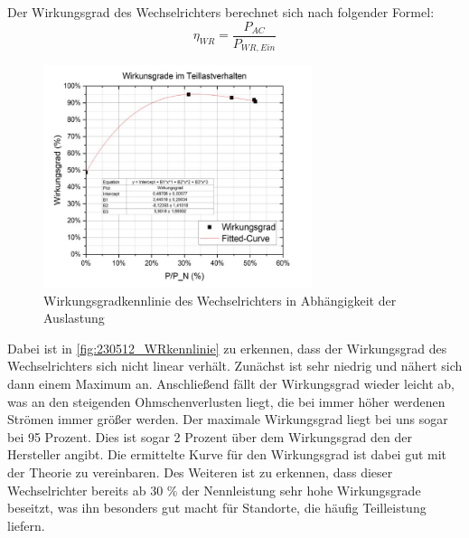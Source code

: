 Der Wirkungsgrad des Wechselrichters berechnet sich nach folgender Formel:
%
\begin{equation}
	\eta_{ WR} = \frac{ P_{AC} }{ P_{WR,Ein} }
	\label{eq:230509_Wirkungsgrad}
\end{equation}
%
%
\begin{figure}[!ht]
		\centering
		\includegraphics[width=0.7\textwidth]{Abbildungen/Kennlinie wr}
		\caption{Wirkungsgradkennlinie des Wechselrichters in Abhängigkeit der Auslastung}
		\label{fig:230512_WRkennlinie}
\end{figure}
%
Dabei ist in \autoref{fig:230512_WRkennlinie} zu erkennen, dass der Wirkungsgrad des Wechselrichters sich nicht linear verhält. Zunächst ist sehr niedrig und nähert sich dann einem Maximum an. Anschließend fällt der Wirkungsgrad wieder leicht ab, was an den steigenden Ohmschenverlusten liegt, die bei immer höher werdenen Strömen immer größer werden. Der maximale Wirkungsgrad liegt bei uns sogar bei 95 Prozent. Dies ist sogar 2 Prozent über dem Wirkungsgrad den der Hersteller angibt. Die ermittelte Kurve für den Wirkungsgrad ist dabei gut mit der Theorie zu vereinbaren. Des Weiteren ist zu erkennen, dass dieser Wechselrichter bereits ab 30 \% der Nennleistung sehr hohe Wirkungsgrade beseitzt, was ihn besonders gut macht für Standorte, die häufig Teilleistung liefern.
